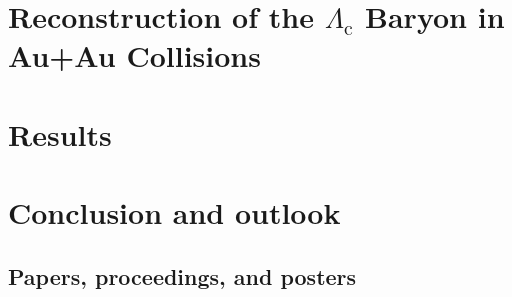 \documentclass[a4paper,titlepage,11pt,twoside,openright]{report} %
\newcommand{\Lambdac}{\ensuremath{{\Lambda_\text{c}}}}
\begin{document}


\cleardoublepage
\chapter{Reconstruction of the $\Lambda_\text{c}$ Baryon in Au+Au Collisions\label{ReconstructionChapter}}


\cleardoublepage
\chapter{Results\label{resultsChapter}}


\cleardoublepage
\chapter{Conclusion and outlook} \label{conclusion}





\cleardoublepage


\cleardoublepage
\begin{appendices}
\chapter{Papers, proceedings, and posters}

\end{appendices}
\end{document}
